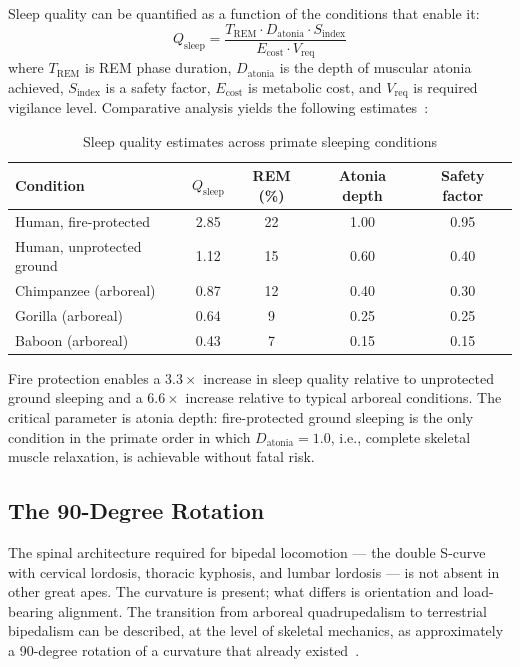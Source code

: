 Sleep quality can be quantified as a function of the conditions that enable it:
%
\begin{equation}
Q_{\mathrm{sleep}} = \frac{T_{\mathrm{REM}} \cdot D_{\mathrm{atonia}} \cdot S_{\mathrm{index}}}{E_{\mathrm{cost}} \cdot V_{\mathrm{req}}}
\end{equation}
%
where $T_{\mathrm{REM}}$ is REM phase duration, $D_{\mathrm{atonia}}$ is the depth of muscular atonia achieved, $S_{\mathrm{index}}$ is a safety factor, $E_{\mathrm{cost}}$ is metabolic cost, and $V_{\mathrm{req}}$ is required vigilance level. Comparative analysis yields the following estimates~\cite{author_fire_catalyst}:

\begin{table}[h!]
\centering
\caption{Sleep quality estimates across primate sleeping conditions}
\label{tab:sleep_quality}
\begin{tabular}{lcccc}
\toprule
Condition & $Q_{\mathrm{sleep}}$ & REM (\%) & Atonia depth & Safety factor \\
\midrule
Human, fire-protected & 2.85 & 22 & 1.00 & 0.95 \\
Human, unprotected ground & 1.12 & 15 & 0.60 & 0.40 \\
Chimpanzee (arboreal) & 0.87 & 12 & 0.40 & 0.30 \\
Gorilla (arboreal) & 0.64 & 9 & 0.25 & 0.25 \\
Baboon (arboreal) & 0.43 & 7 & 0.15 & 0.15 \\
\bottomrule
\end{tabular}
\end{table}

Fire protection enables a $3.3\times$ increase in sleep quality relative to unprotected ground sleeping and a $6.6\times$ increase relative to typical arboreal conditions. The critical parameter is atonia depth: fire-protected ground sleeping is the only condition in the primate order in which $D_{\mathrm{atonia}} = 1.0$, i.e., complete skeletal muscle relaxation, is achievable without fatal risk.

\subsection{The 90-Degree Rotation}

The spinal architecture required for bipedal locomotion --- the double S-curve with cervical lordosis, thoracic kyphosis, and lumbar lordosis --- is not absent in other great apes. The curvature is present; what differs is orientation and load-bearing alignment. The transition from arboreal quadrupedalism to terrestrial bipedalism can be described, at the level of skeletal mechanics, as approximately a 90-degree rotation of a curvature that already existed~\cite{author_bipedalism}.

